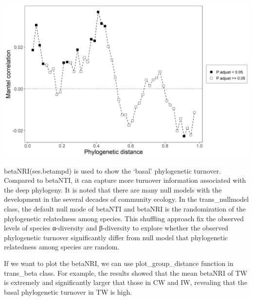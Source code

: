 \documentclass[
]{book}
\newenvironment{Shaded}{\begin{snugshade}}{\end{snugshade}}
\newcommand{\AttributeTok}[1]{\textcolor[rgb]{0.77,0.63,0.00}{#1}}
\newcommand{\CommentTok}[1]{\textcolor[rgb]{0.56,0.35,0.01}{\textit{#1}}}
\newcommand{\ConstantTok}[1]{\textcolor[rgb]{0.00,0.00,0.00}{#1}}
\newcommand{\DecValTok}[1]{\textcolor[rgb]{0.00,0.00,0.81}{#1}}
\newcommand{\FunctionTok}[1]{\textcolor[rgb]{0.00,0.00,0.00}{#1}}
\newcommand{\NormalTok}[1]{#1}
\newcommand{\SpecialCharTok}[1]{\textcolor[rgb]{0.00,0.00,0.00}{#1}}
\begin{document}
\begin{center}\includegraphics[width=600px]{Images/plot_mantel_corr} \end{center}

betaNRI(ses.betampd) is used to show the `basal' phylogenetic turnover.
Compared to betaNTI, it can capture more turnover information associated with the deep phylogeny.
It is noted that there are many null models with the development in the several decades of community ecology.
In the trans\_nullmodel class,
the default null mode of betaNTI and betaNRI is the randomization of the phylogenetic relatedness among species.
This shuffling approach fix the observed levels of species α-diversity and β-diversity to
explore whether the observed phylogenetic turnover significantly differ from null model that phylogenetic relatedness among species are random.

\begin{Shaded}
\end{Shaded}

If we want to plot the betaNRI, we can use plot\_group\_distance function in trans\_beta class.
For example, the results showed that the mean betaNRI of TW is extremely and significantly larger that those in CW and IW,
revealing that the basal phylogenetic turnover in TW is high.
\end{document}
